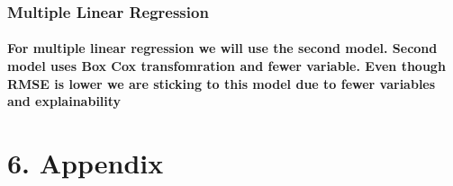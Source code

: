 \documentclass[]{article}
\newenvironment{Shaded}{\begin{snugshade}}{\end{snugshade}}
\newcommand{\DataTypeTok}[1]{\textcolor[rgb]{0.13,0.29,0.53}{#1}}
\newcommand{\KeywordTok}[1]{\textcolor[rgb]{0.13,0.29,0.53}{\textbf{#1}}}
\newcommand{\NormalTok}[1]{#1}
\newcommand{\OperatorTok}[1]{\textcolor[rgb]{0.81,0.36,0.00}{\textbf{#1}}}
\newcommand{\OtherTok}[1]{\textcolor[rgb]{0.56,0.35,0.01}{#1}}
\newcommand{\StringTok}[1]{\textcolor[rgb]{0.31,0.60,0.02}{#1}}
\let\oldparagraph\paragraph
\renewcommand{\paragraph}[1]{\oldparagraph{#1}\mbox{}}
\begin{document}
\hypertarget{multiple-linear-regression}{%
\subsubsection{\texorpdfstring{\textbf{Multiple Linear
Regression}}{Multiple Linear Regression}}\label{multiple-linear-regression}}

\hypertarget{for-multiple-linear-regression-we-will-use-the-second-model.-second-model-uses-box-cox-transfomration-and-fewer-variable.-even-though-rmse-is-lower-we-are-sticking-to-this-model-due-to-fewer-variables-and-explainability}{%
\paragraph{For multiple linear regression we will use the second model.
Second model uses Box Cox transfomration and fewer variable. Even though
RMSE is lower we are sticking to this model due to fewer variables and
explainability}\label{for-multiple-linear-regression-we-will-use-the-second-model.-second-model-uses-box-cox-transfomration-and-fewer-variable.-even-though-rmse-is-lower-we-are-sticking-to-this-model-due-to-fewer-variables-and-explainability}}

\begin{Shaded}
\end{Shaded}

\hypertarget{appendix}{%
\section{6. Appendix}\label{appendix}}
\end{document}
